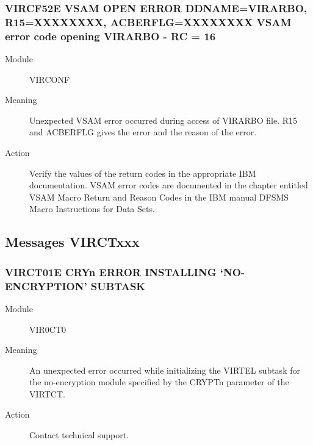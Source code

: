 \documentclass[letterpaper,10pt,english]{sphinxmanual}
\begin{document}
\subsubsection{VIRCF52E VSAM OPEN ERROR DDNAME=VIRARBO, R15=XXXXXXXX, ACBERFLG=XXXXXXXX VSAM error code opening VIRARBO - RC = 16}
\label{\detokenize{messages:vircf52e-vsam-open-error-ddname-virarbo-r15-xxxxxxxx-acberflg-xxxxxxxx-vsam-error-code-opening-virarbo-rc-16}}\begin{description}
\item[{Module}] \leavevmode
VIRCONF

\item[{Meaning}] \leavevmode
Unexpected VSAM error occurred during access of VIRARBO file. R15 and ACBERFLG gives the error and the reason of the error.

\item[{Action}] \leavevmode
Verify the values of the return codes in the appropriate IBM documentation. VSAM error codes are documented in the chapter entitled VSAM Macro Return and Reason Codes in the IBM manual DFSMS Macro Instructions for Data Sets.

\end{description}


\subsection{Messages VIRCTxxx}
\label{\detokenize{messages:messages-virctxxx}}

\subsubsection{VIRCT01E CRYn ERROR INSTALLING ‘NO-ENCRYPTION’ SUBTASK}
\label{\detokenize{messages:virct01e-cryn-error-installing-no-encryption-subtask}}\begin{description}
\item[{Module}] \leavevmode
VIR0CT0

\item[{Meaning}] \leavevmode
An unexpected error occurred while initializing the VIRTEL subtask for the no-encryption module specified by the CRYPTn parameter of the VIRTCT.

\item[{Action}] \leavevmode
Contact technical support.

\end{description}
\end{document}
